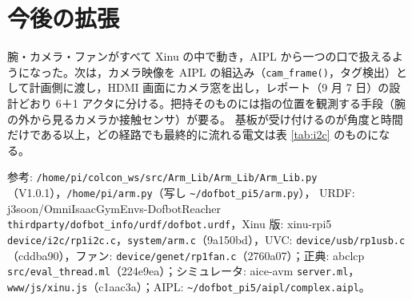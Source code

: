 \documentclass[a4paper,11pt]{article}
\begin{document}
\section{今後の拡張}
腕・カメラ・ファンがすべて Xinu の中で動き，AIPL から一つの口で扱えるようになった。次は，カメラ映像を AIPL の組込み（\texttt{cam\_frame()}，タグ検出）として計画側に渡し，HDMI 画面にカメラ窓を出し，レポート（9 月 7 日）の設計どおり 6＋1 アクタに分ける。把持そのものには指の位置を観測する手段（腕の外から見るカメラか接触センサ）が要る。
基板が受け付けるのが角度と時間だけである以上，どの経路でも最終的に流れる電文は表 \ref{tab:i2c} のものになる。

\vfill
{\small\raggedright 参考: \texttt{/home/pi/colcon\_ws/src/Arm\_Lib/Arm\_Lib/Arm\_Lib.py}（V1.0.1），\texttt{/home/pi/arm.py}（写し \texttt{\textasciitilde/dofbot\_pi5/arm.py}），
URDF: j3soon/OmniIsaacGymEnvs-DofbotReacher \texttt{thirdparty/dofbot\_info/urdf/dofbot.urdf}，Xinu 版: xinu-rpi5 \texttt{device/i2c/rp1i2c.c}，\texttt{system/arm.c}（9a150bd），UVC: \texttt{device/usb/rp1usb.c}（cddba90），ファン: \texttt{device/genet/rp1fan.c}（2760a07）；正典: abclcp \texttt{src/eval\_thread.ml}（224e9ea）；シミュレータ: aice-avm \texttt{server.ml}，\texttt{www/js/xinu.js}（c1aac3a）；AIPL: \texttt{\textasciitilde/dofbot\_pi5/aipl/complex.aipl}。\par}
\end{document}
